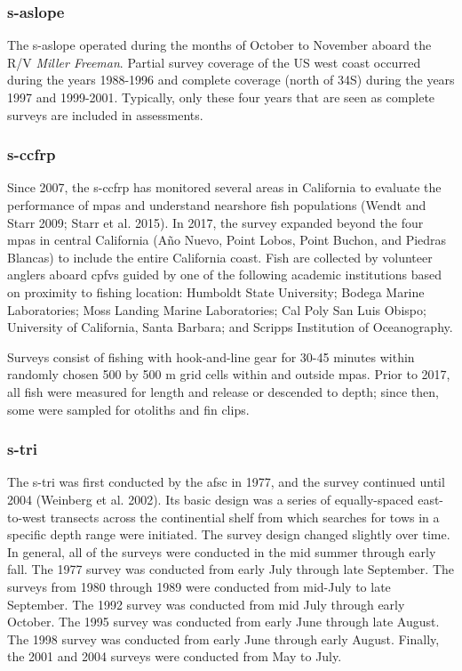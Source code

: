 \documentclass[11pt,
  english,
  letterpaper,
]{article}
\begin{document}
\hypertarget{section}{%
\subsubsection{\texorpdfstring{\acrlong{s-aslope}}{}}\label{section}}

The \gls{s-aslope} operated during the months of October to November aboard the R/V \emph{Miller Freeman}. Partial survey coverage of the US west coast occurred during the years 1988-1996 and complete coverage (north of 34\textquotesingle S) during the years 1997 and 1999-2001. Typically, only these four years that are seen as complete surveys are included in assessments.

\hypertarget{section-1}{%
\subsubsection{\texorpdfstring{\acrlong{s-ccfrp}}{}}\label{section-1}}

Since 2007, the \gls{s-ccfrp} has monitored several areas in California to evaluate the performance of \glspl{mpa} and understand nearshore fish populations (Wendt and Starr 2009; Starr et al. 2015). In 2017, the survey expanded beyond the four \Gls{mpa}s in central California (Año Nuevo, Point Lobos, Point Buchon, and Piedras Blancas) to include the entire California coast. Fish are collected by volunteer anglers aboard \glspl{cpfv} guided by one of the following academic institutions based on proximity to fishing location: Humboldt State University; Bodega Marine Laboratories; Moss Landing Marine Laboratories; Cal Poly San Luis Obispo; University of California, Santa Barbara; and Scripps Institution of Oceanography.

Surveys consist of fishing with hook-and-line gear for 30-45 minutes within randomly chosen 500 by 500 m grid cells within and outside \glspl{mpa}. Prior to 2017, all fish were measured for length and release or descended to depth; since then, some were sampled for otoliths and fin clips.

\hypertarget{section-2}{%
\subsubsection{\texorpdfstring{\acrlong{s-tri}}{}}\label{section-2}}

The \gls{s-tri} was first conducted by the \gls{afsc} in 1977, and the survey continued until 2004 (Weinberg et al. 2002). Its basic design was a series of equally-spaced east-to-west transects across the continential shelf from which searches for tows in a specific depth range were initiated. The survey design changed slightly over time. In general, all of the surveys were conducted in the mid summer through early fall. The 1977 survey was conducted from early July through late September. The surveys from 1980 through 1989 were conducted from mid-July to late September. The 1992 survey was conducted from mid July through early October. The 1995 survey was conducted from early June through late August. The 1998 survey was conducted from early June through early August. Finally, the 2001 and 2004 surveys were conducted from May to July.
\end{document}
